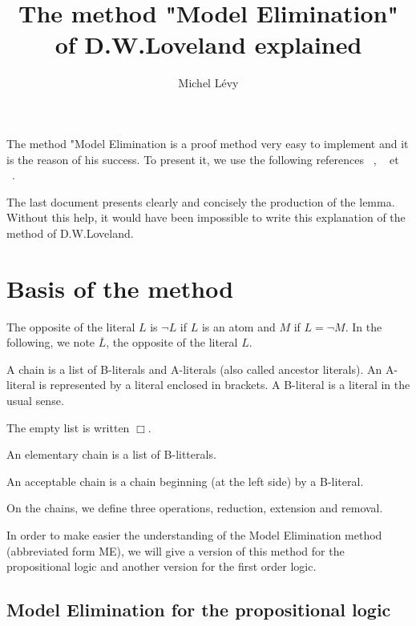 \documentclass{article}
\title{The method "Model Elimination" of D.W.Loveland explained}
\author{Michel Lévy}
\begin{document}
\maketitle
\tableofcontents
The method "Model Elimination is a proof method very easy to implement and it is the reason of his success.
To present it, we use the following references
 ~\cite{Loveland1997}, ~\cite{Loveland1978} et  ~\cite{CSC648}.

The last document presents clearly and concisely the production of the lemma. Without this help, it would have been impossible
to write this explanation of the method of D.W.Loveland.




\section{Basis of the method}

The opposite of the literal $L$ is $\neg L$ if $L$ is an atom and $M$ if $L = \neg M$.
In the following, we note  
 $\overline{L}$, the opposite of the literal $L$.

A chain is a list of B-literals and A-literals (also called ancestor literals). An A-literal is represented by a literal
enclosed in brackets. A B-literal is a literal in the usual sense.

The empty list is written $\Box$.

An elementary chain is a list of B-litterals.

An acceptable chain is a chain beginning (at the left side) by a B-literal.

On the chains, we define three operations, reduction, extension and removal.

In order to make easier the understanding of the Model Elimination method (abbreviated form ME), we will give a version of
this method for the propositional logic and another version for the first order logic.


\subsection{Model Elimination for the propositional logic}
\end{document}
